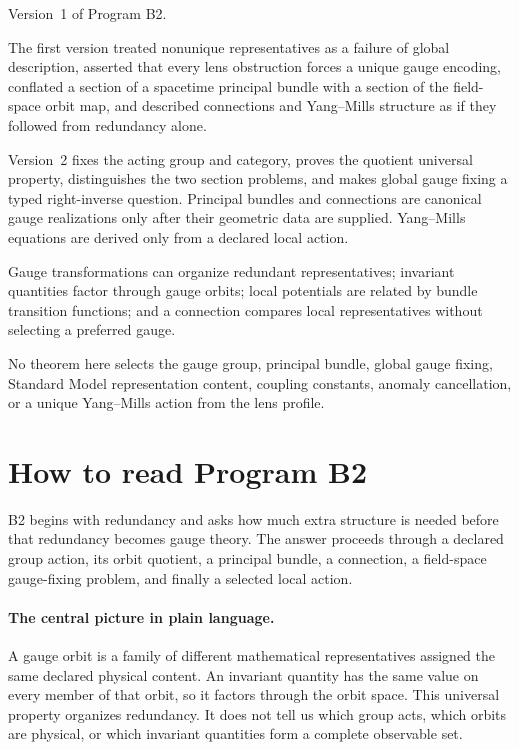 \documentclass[11pt]{article}
\begin{document}
\begin{description}[leftmargin=2.5cm,style=nextline]
\item[Supersedes.]
Version~1 of Program B2.

\item[Reason.]
The first version treated nonunique representatives as a failure of global
description, asserted that every lens obstruction forces a unique gauge
encoding, conflated a section of a spacetime principal bundle with a section
of the field-space orbit map, and described connections and Yang--Mills
structure as if they followed from redundancy alone.

\item[Resolution.]
Version~2 fixes the acting group and category, proves the quotient universal
property, distinguishes the two section problems, and makes global gauge
fixing a typed right-inverse question.  Principal bundles and connections are
canonical gauge realizations only after their geometric data are supplied.
Yang--Mills equations are derived only from a declared local action.

\item[Retained content.]
Gauge transformations can organize redundant representatives; invariant
quantities factor through gauge orbits; local potentials are related by bundle
transition functions; and a connection compares local representatives without
selecting a preferred gauge.

\item[Open boundary.]
No theorem here selects the gauge group, principal bundle, global gauge
fixing, Standard Model representation content, coupling constants, anomaly
cancellation, or a unique Yang--Mills action from the lens profile.
\end{description}

\section*{How to read Program B2}
B2 begins with redundancy and asks how much extra structure is needed before
that redundancy becomes gauge theory.  The answer proceeds through a declared
group action, its orbit quotient, a principal bundle, a connection, a
field-space gauge-fixing problem, and finally a selected local action.

\paragraph{The central picture in plain language.}
A gauge orbit is a family of different mathematical representatives assigned
the same declared physical content.  An invariant quantity has the same value
on every member of that orbit, so it factors through the orbit space.  This
universal property organizes redundancy.  It does not tell us which group
acts, which orbits are physical, or which invariant quantities form a complete
observable set.
\end{document}
